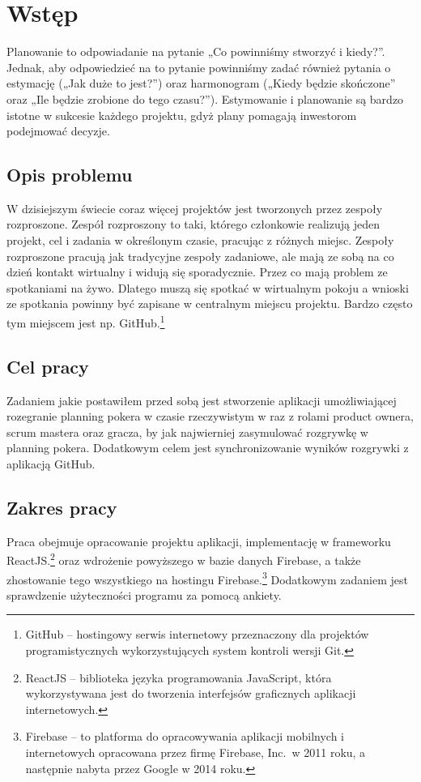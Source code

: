 ﻿\chapter*{Wstęp}
Planowanie to odpowiadanie na pytanie „Co powinniśmy stworzyć i kiedy?”.
Jednak, aby odpowiedzieć na to pytanie powinniśmy zadać również pytania o estymację
(„Jak duże to jest?”) oraz harmonogram („Kiedy będzie skończone” oraz „Ile będzie zrobione do tego czasu?”).
Estymowanie i planowanie są bardzo istotne w sukcesie każdego projektu,
gdyż plany pomagają inwestorom podejmować decyzje.\cite{Cohen_2006}
\section*{Opis problemu}

W dzisiejszym świecie coraz więcej projektów jest tworzonych przez zespoły rozproszone.
Zespół rozproszony to taki, którego członkowie realizują jeden projekt,
cel i zadania w określonym czasie, pracując z różnych miejsc. 
Zespoły rozproszone pracują jak tradycyjne zespoły zadaniowe,
ale mają ze sobą na co dzień kontakt wirtualny i widują się sporadycznie.\cite{www_rozproszony}
Przez co mają problem ze spotkaniami na żywo.
Dlatego muszą się spotkać w wirtualnym pokoju a wnioski ze spotkania powinny być zapisane w centralnym miejscu projektu.
Bardzo często tym miejscem jest np. GitHub.\footnote{GitHub – hostingowy serwis internetowy przeznaczony dla projektów programistycznych wykorzystujących system kontroli wersji Git.}

\section*{Cel pracy}

Zadaniem jakie postawiłem przed sobą jest stworzenie aplikacji umożliwiającej rozegranie planning pokera w czasie rzeczywistym w raz z rolami product ownera,
scrum mastera oraz gracza, by jak najwierniej zasymulować rozgrywkę w planning pokera.
Dodatkowym celem jest synchronizowanie wyników rozgrywki z aplikacją GitHub.

\section*{Zakres pracy}

Praca obejmuje opracowanie projektu aplikacji, implementację w frameworku ReactJS.\footnote{ReactJS – biblioteka języka programowania JavaScript, która wykorzystywana jest do tworzenia interfejsów graficznych aplikacji internetowych.}
oraz wdrożenie powyższego w bazie danych Firebase, a także zhostowanie tego wszystkiego na hostingu Firebase.\footnote{Firebase – to platforma do opracowywania aplikacji mobilnych i internetowych opracowana przez firmę Firebase, Inc.\ w 2011 roku, a następnie nabyta przez Google w 2014 roku.}
Dodatkowym zadaniem jest sprawdzenie użyteczności programu za pomocą ankiety.
